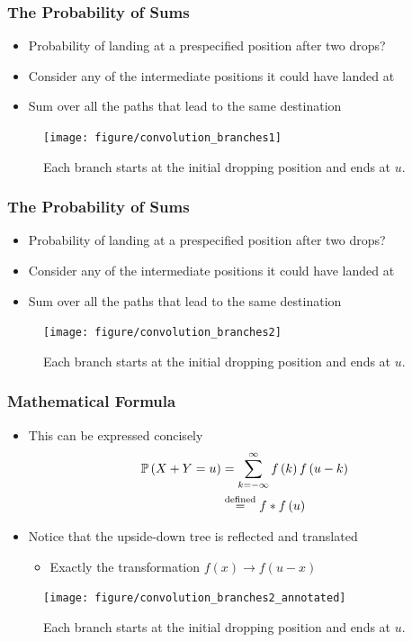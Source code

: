 \documentclass[10pt,mathserif]{beamer}
\begin{document}
\begin{frame}
  \frametitle{The Probability of Sums}
  \begin{itemize}
    \item Probability of landing at a prespecified position after
      two drops?
    \item Consider any of the intermediate positions it could have
      landed at
    \item Sum over all the paths that lead to the same destination
  \end{itemize}
  \begin{figure}[ht]
    \centering
    \texttt{[image: figure/convolution\_branches1]}
    \caption{Each branch starts at the initial dropping position and ends at
      $u$. \label{fig:convolution_branches} }
  \end{figure}
\end{frame}

\begin{frame}
  \frametitle{The Probability of Sums}
  \begin{itemize}
    \item Probability of landing at a prespecified position after
      two drops?
    \item Consider any of the intermediate positions it could have
      landed at
    \item Sum over all the paths that lead to the same destination
  \end{itemize}
  \begin{figure}[ht]
    \centering
    \texttt{[image: figure/convolution\_branches2]}
    \caption{Each branch starts at the initial dropping position and ends at
      $u$. \label{fig:convolution_branches} }
  \end{figure}
\end{frame}

\begin{frame}
  \frametitle{Mathematical Formula}
  \begin{itemize}
    \item This can be expressed concisely
      \begin{align*}
        \mathbb{P}\left({X + Y = u}\right) &= \sum_{k = -\infty}^{\infty} f\left(k\right)f\left(u - k\right) \\
        &\stackrel{\text{defined}}{=} f * f \left(u\right)
      \end{align*}
    \item Notice that the upside-down tree is reflected and translated
      \begin{itemize}
      \item Exactly the transformation $f\left(x\right) \rightarrow f\left(u - x\right)$
      \end{itemize}
  \end{itemize}
  \begin{figure}[ht]
    \centering
    \texttt{[image: figure/convolution\_branches2\_annotated]}
    \caption{Each branch starts at the initial dropping position and ends at
      $u$. \label{fig:convolution_branches} }
  \end{figure}
\end{frame}
\end{document}
